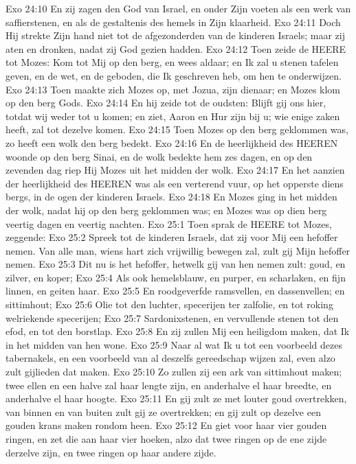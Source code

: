 Exo 24:10  En zij zagen den God van Israel, en onder Zijn voeten als een werk van saffierstenen, en als de gestaltenis des hemels in Zijn klaarheid.
Exo 24:11  Doch Hij strekte Zijn hand niet tot de afgezonderden van de kinderen Israels; maar zij aten en dronken, nadat zij God gezien hadden.
Exo 24:12  Toen zeide de HEERE tot Mozes: Kom tot Mij op den berg, en wees aldaar; en Ik zal u stenen tafelen geven, en de wet, en de geboden, die Ik geschreven heb, om hen te onderwijzen.
Exo 24:13  Toen maakte zich Mozes op, met Jozua, zijn dienaar; en Mozes klom op den berg Gods.
Exo 24:14  En hij zeide tot de oudsten: Blijft gij ons hier, totdat wij weder tot u komen; en ziet, Aaron en Hur zijn bij u; wie enige zaken heeft, zal tot dezelve komen.
Exo 24:15  Toen Mozes op den berg geklommen was, zo heeft een wolk den berg bedekt.
Exo 24:16  En de heerlijkheid des HEEREN woonde op den berg Sinai, en de wolk bedekte hem zes dagen, en op den zevenden dag riep Hij Mozes uit het midden der wolk.
Exo 24:17  En het aanzien der heerlijkheid des HEEREN was als een verterend vuur, op het opperste diens bergs, in de ogen der kinderen Israels.
Exo 24:18  En Mozes ging in het midden der wolk, nadat hij op den berg geklommen was; en Mozes was op dien berg veertig dagen en veertig nachten.
Exo 25:1  Toen sprak de HEERE tot Mozes, zeggende:
Exo 25:2  Spreek tot de kinderen Israels, dat zij voor Mij een hefoffer nemen. Van alle man, wiens hart zich vrijwillig bewegen zal, zult gij Mijn hefoffer nemen.
Exo 25:3  Dit nu is het hefoffer, hetwelk gij van hen nemen zult: goud, en zilver, en koper;
Exo 25:4  Als ook hemelsblauw, en purper, en scharlaken, en fijn linnen, en geiten haar.
Exo 25:5  En roodgeverfde ramsvellen, en dassenvellen; en sittimhout;
Exo 25:6  Olie tot den luchter, specerijen ter zalfolie, en tot roking welriekende specerijen;
Exo 25:7  Sardonixstenen, en vervullende stenen tot den efod, en tot den borstlap.
Exo 25:8  En zij zullen Mij een heiligdom maken, dat Ik in het midden van hen wone.
Exo 25:9  Naar al wat Ik u tot een voorbeeld dezes tabernakels, en een voorbeeld van al deszelfs gereedschap wijzen zal, even alzo zult gijlieden dat maken.
Exo 25:10  Zo zullen zij een ark van sittimhout maken; twee ellen en een halve zal haar lengte zijn, en anderhalve el haar breedte, en anderhalve el haar hoogte.
Exo 25:11  En gij zult ze met louter goud overtrekken, van binnen en van buiten zult gij ze overtrekken; en gij zult op dezelve een gouden krans maken rondom heen.
Exo 25:12  En giet voor haar vier gouden ringen, en zet die aan haar vier hoeken, alzo dat twee ringen op de ene zijde derzelve zijn, en twee ringen op haar andere zijde.
